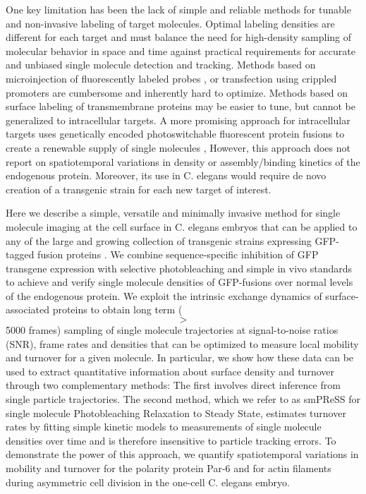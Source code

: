  
 One key limitation has been the lack of simple and reliable methods for tunable and non-invasive labeling of target molecules. Optimal labeling densities are different for each target and must balance the need for high-density sampling of molecular behavior in space and time against practical requirements for accurate and unbiased single molecule detection and tracking. Methods based on microinjection of fluorescently labeled probes \cite{nmeth4,nmeth5}, or transfection using crippled promoters \cite{nmeth6,nmeth7,nmeth8,nmeth9} are cumbersome and inherently hard to optimize. Methods based on surface labeling of transmembrane proteins \cite{nmeth10,nmeth11,nmeth12,nmeth13} may be easier to tune, but cannot be generalized to intracellular targets. A more promising approach for intracellular targets uses genetically encoded photoswitchable fluorescent protein fusions to create a renewable supply of single molecules \cite{nmeth14,nmeth15,nmeth16}, However, this approach does not report on spatiotemporal variations in density or assembly/binding kinetics of the endogenous protein. Moreover, its use in C. elegans would require de novo creation of a transgenic strain for each new target of interest.
 
 
 Here we describe a simple, versatile and minimally invasive method for single molecule imaging at the cell surface in C. elegans embryos that can be applied to any of the large and growing collection of transgenic strains expressing GFP-tagged fusion proteins \cite{nmeth17}. We combine sequence-specific inhibition of GFP transgene expression with selective photobleaching and simple in vivo standards to achieve and verify single molecule densities of GFP-fusions over normal levels of the endogenous protein. We exploit the intrinsic exchange dynamics of surface-associated proteins to obtain long term ($$>$$ 5000 frames) sampling of single molecule trajectories at signal-to-noise ratios (SNR), frame rates and densities that can be optimized to measure local mobility and turnover for a given molecule. In particular, we show how these data can be used to extract quantitative information about surface density and turnover through two complementary methods: The first involves direct inference from single particle trajectories. The second method, which we refer to as smPReSS for single molecule Photobleaching Relaxation to Steady State, estimates turnover rates by fitting simple kinetic models to measurements of single molecule densities over time and is therefore insensitive to particle tracking errors. To demonstrate the power of this approach, we quantify spatiotemporal variations in mobility and turnover for the polarity protein Par-6 and for actin filaments during asymmetric cell division in the one-cell C. elegans embryo.
 
